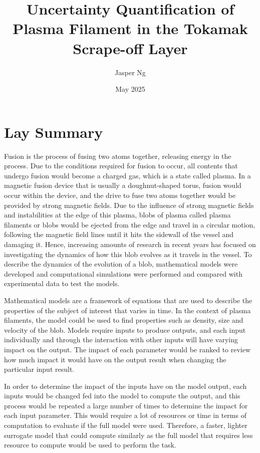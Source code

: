 \documentclass{article}
\title{\textbf{Uncertainty Quantification of Plasma Filament in the Tokamak Scrape-off Layer}}
\author{Jasper Ng}
\date{May 2025}
\begin{document}
\maketitle

\section*{Lay Summary}
Fusion is the process of fusing two atoms together, releasing energy in the process. Due to the conditions required for fusion to occur, all contents that undergo fusion would become a charged gas, which is a state called plasma. In a magnetic fusion device that is usually a doughnut-shaped torus, fusion would occur within the device, and the drive to fuse two atoms together would be provided by strong magnetic fields. Due to the influence of strong magnetic fields and instabilities at the edge of this plasma, blobs of plasma called plasma filaments or blobs would be ejected from the edge and travel in a circular motion, following the magnetic field lines until it hits the sidewall of the vessel and damaging it. Hence, increasing amounts of research in recent years has focused on investigating the dynamics of how this blob evolves as it travels in the vessel. To describe the dynamics of the evolution of a blob, mathematical models were developed and computational simulations were performed and compared with experimental data to test the models.

Mathematical models are a framework of equations that are used to describe the properties of the subject of interest that varies in time. In the context of plasma filaments, the model could be used to find properties such as density, size and velocity of the blob. Models require inputs to produce outputs, and each input individually and through the interaction with other inputs will have varying impact on the output. The impact of each parameter would be ranked to review how much impact it would have on the output result when changing the particular input result.

In order to determine the impact of the inputs have on the model output, each inputs would be changed fed into the model to compute the output, and this process would be repeated a large number of times to determine the impact for each input parameter. This would require a lot of resources or time in terms of computation to evaluate if the full model were used. Therefore, a faster, lighter surrogate model that could compute similarly as the full model that requires less resource to compute would be used to perform the task.
\end{document}
